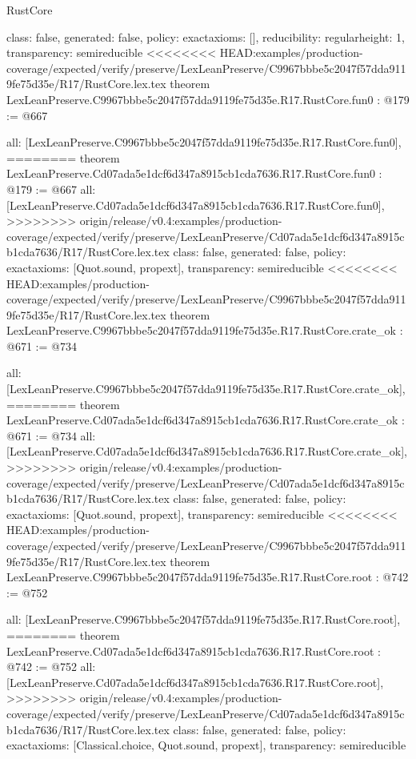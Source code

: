 \begin{lexlean}{RustCore}
\begin{coremodule}
{\begin{coremodule}
{{{  class: false,
  generated: false,
  policy: exact{axioms: []},
  reducibility: regular{height: 1},
  transparency: semireducible
}
<<<<<<<< HEAD:examples/production-coverage/expected/verify/preserve/LexLeanPreserve/C9967bbbe5c2047f57dda9119fe75d35e/R17/RustCore.lex.tex
theorem LexLeanPreserve.C9967bbbe5c2047f57dda9119fe75d35e.R17.RustCore.fun0 : @179 := @667 {
  all: [LexLeanPreserve.C9967bbbe5c2047f57dda9119fe75d35e.R17.RustCore.fun0],
========
theorem LexLeanPreserve.Cd07ada5e1dcf6d347a8915cb1cda7636.R17.RustCore.fun0 : @179 := @667 {
  all: [LexLeanPreserve.Cd07ada5e1dcf6d347a8915cb1cda7636.R17.RustCore.fun0],
>>>>>>>> origin/release/v0.4:examples/production-coverage/expected/verify/preserve/LexLeanPreserve/Cd07ada5e1dcf6d347a8915cb1cda7636/R17/RustCore.lex.tex
  class: false,
  generated: false,
  policy: exact{axioms: [Quot.sound, propext]},
  transparency: semireducible
}
<<<<<<<< HEAD:examples/production-coverage/expected/verify/preserve/LexLeanPreserve/C9967bbbe5c2047f57dda9119fe75d35e/R17/RustCore.lex.tex
theorem LexLeanPreserve.C9967bbbe5c2047f57dda9119fe75d35e.R17.RustCore.crate_ok : @671 := @734 {
  all: [LexLeanPreserve.C9967bbbe5c2047f57dda9119fe75d35e.R17.RustCore.crate_ok],
========
theorem LexLeanPreserve.Cd07ada5e1dcf6d347a8915cb1cda7636.R17.RustCore.crate_ok : @671 := @734 {
  all: [LexLeanPreserve.Cd07ada5e1dcf6d347a8915cb1cda7636.R17.RustCore.crate_ok],
>>>>>>>> origin/release/v0.4:examples/production-coverage/expected/verify/preserve/LexLeanPreserve/Cd07ada5e1dcf6d347a8915cb1cda7636/R17/RustCore.lex.tex
  class: false,
  generated: false,
  policy: exact{axioms: [Quot.sound, propext]},
  transparency: semireducible
}
<<<<<<<< HEAD:examples/production-coverage/expected/verify/preserve/LexLeanPreserve/C9967bbbe5c2047f57dda9119fe75d35e/R17/RustCore.lex.tex
theorem LexLeanPreserve.C9967bbbe5c2047f57dda9119fe75d35e.R17.RustCore.root : @742 := @752 {
  all: [LexLeanPreserve.C9967bbbe5c2047f57dda9119fe75d35e.R17.RustCore.root],
========
theorem LexLeanPreserve.Cd07ada5e1dcf6d347a8915cb1cda7636.R17.RustCore.root : @742 := @752 {
  all: [LexLeanPreserve.Cd07ada5e1dcf6d347a8915cb1cda7636.R17.RustCore.root],
>>>>>>>> origin/release/v0.4:examples/production-coverage/expected/verify/preserve/LexLeanPreserve/Cd07ada5e1dcf6d347a8915cb1cda7636/R17/RustCore.lex.tex
  class: false,
  generated: false,
  policy: exact{axioms: [Classical.choice, Quot.sound, propext]},
  transparency: semireducible
}

}}}}}
\end{coremodule}}
\end{coremodule}
\end{lexlean}
